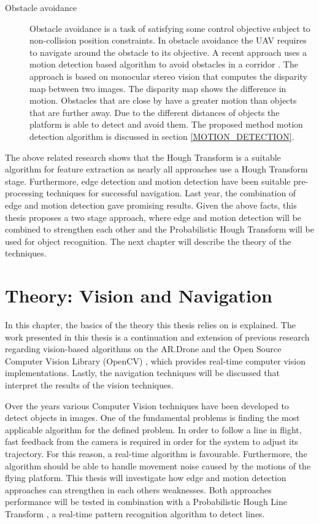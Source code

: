 \documentclass[a4paper]{article}
\begin{document}
\begin{description}
\item[Obstacle avoidance] Obstacle avoidance is a task of satisfying some control objective subject to non-collision position constraints. In obstacle avoidance the UAV requires to navigate around the obstacle to its objective. A recent approach uses a motion detection based algorithm to avoid obstacles in a corridor \cite{Jurriaans2011}. The approach is based on monocular stereo vision that computes the disparity map between two images. The disparity map shows the difference in motion. Obstacles that are close by have a greater motion than objects that are further away. Due to the different distances of objects the platform is able to detect and avoid them. The proposed method motion detection algorithm is discussed in section \ref{MOTION_DETECTION}.
\end{description}

The above related research shows that the Hough Transform is a suitable algorithm for feature extraction as nearly all approaches use a Hough Transform stage. Furthermore, edge detection and motion detection have been suitable pre-processing techniques for successful navigation. Last year, the combination of edge and motion detection gave promising results. Given the above facts, this thesis proposes a two stage approach, where edge and motion detection will be combined to strengthen each other and the Probabilistic Hough Transform will be used for object recognition. The next chapter will describe the theory of the techniques.

\newpage
\section{Theory: Vision and Navigation}
\label{THEORY}
In this chapter, the basics of the theory this thesis relies on is explained. The work presented in this thesis is a continuation and extension of previous research regarding vision-based algorithms on the AR.Drone \cite{Jurriaans2011} and the Open Source Computer Vision Library (OpenCV) \cite{Bradski2008}, which provides real-time computer vision implementations. Lastly, the navigation techniques will be discussed that interpret the results of the vision techniques.

Over the years various Computer Vision techniques have been developed to detect objects in images. One of the fundamental problems is finding the most applicable algorithm for the defined problem. In order to follow a line in flight, fast feedback from the camera is required in order for the system to adjust its trajectory. For this reason, a real-time algorithm is favourable. Furthermore, the algorithm should be able to handle movement noise caused by the motions of the flying platform. This thesis will investigate how edge and motion detection approaches can strengthen in each others weaknesses. Both approaches performance will be tested in combination with a Probabilistic Hough Line Transform \cite{Kiryati1991}, a real-time pattern recognition algorithm to detect lines.
\end{document}
